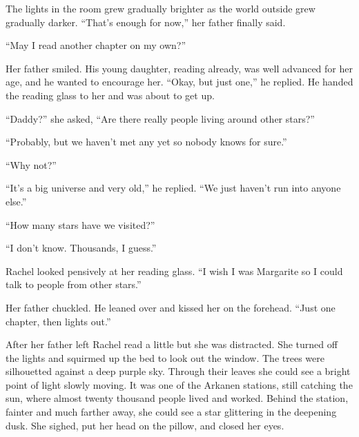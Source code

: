 The lights in the room grew gradually brighter as the world outside grew gradually darker.
``That's enough for now,'' her father finally said.

``May I read another chapter on my own?''

Her father smiled. His young daughter, reading already, was well advanced for her age, and he
wanted to encourage her. ``Okay, but just one,'' he replied. He handed the reading glass to her
and was about to get up.

``Daddy?'' she asked, ``Are there really people living around other stars?''

``Probably, but we haven't met any yet so nobody knows for sure.''

``Why not?''

``It's a big universe and very old,'' he replied. ``We just haven't run into anyone else.''

``How many stars have we visited?''

``I don't know. Thousands, I guess.''

Rachel looked pensively at her reading glass. ``I wish I was Margarite so I could talk to people
from other stars.''

Her father chuckled. He leaned over and kissed her on the forehead. ``Just one chapter, then
lights out.''

After her father left Rachel read a little but she was distracted. She turned off the lights and
squirmed up the bed to look out the window. The trees were silhouetted against a deep purple
sky. Through their leaves she could see a bright point of light slowly moving. It was one of the
Arkanen stations, still catching the sun, where almost twenty thousand people lived and worked.
Behind the station, fainter and much farther away, she could see a star glittering in the
deepening dusk. She sighed, put her head on the pillow, and closed her eyes.
